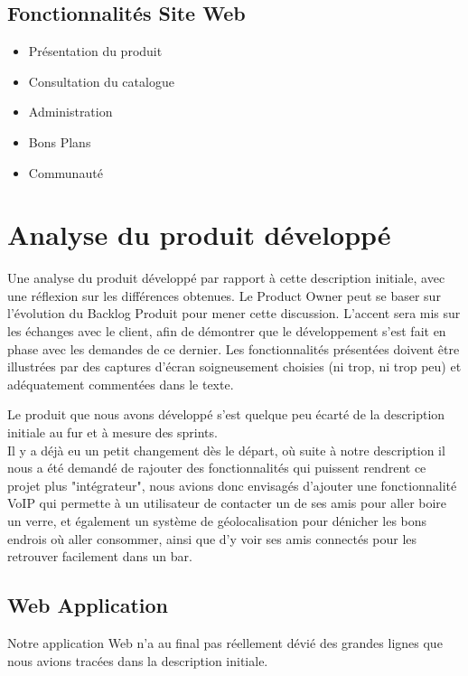 \documentclass{report}
\begin{document}
	\section{Fonctionnalités Site Web}

		\begin{itemize}
			\item Présentation du produit
			\item Consultation du catalogue
			\item Administration
			\item Bons Plans
			\item Communauté
		\end{itemize}


\chapter{Analyse du produit développé} %


	Une analyse du produit développé par rapport à cette description initiale, avec une réflexion sur les différences obtenues.  Le Product Owner peut se baser sur l’évolution du Backlog Produit pour mener cette discussion.  L’accent sera mis sur les échanges avec le client, afin de démontrer que le développement s’est fait en phase avec les demandes de ce dernier.  Les fonctionnalités présentées doivent être illustrées par des captures d’écran soigneusement choisies (ni trop, ni trop peu) et adéquatement commentées dans le texte. 

	Le produit que nous avons développé s'est quelque peu écarté de la description initiale au fur et à mesure des sprints.\\
	Il y a déjà eu un petit changement dès le départ, où suite à notre description il nous a été demandé de rajouter des fonctionnalités qui puissent rendrent ce projet plus "intégrateur", nous avions donc envisagés d'ajouter une fonctionnalité VoIP qui permette à un utilisateur de contacter un de ses amis pour aller boire un verre, et également un système de géolocalisation pour dénicher les bons endrois où aller consommer, ainsi que d'y voir ses amis connectés pour les retrouver facilement dans un bar.\\

	\section{Web Application}

		Notre application Web n'a au final pas réellement dévié des grandes lignes que nous avions tracées dans la description initiale.\\
\end{document}
